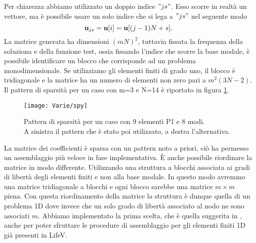 Per chiarezza abbiamo utilizzato un doppio indice $"js"$. Esso scorre in realt\`a  un vettore,
ma \`e possibile usare un solo indice che si lega a $"js"$ nel seguente modo
$$\mathbf{u}_{js}=\mathbf{u}[i]=\mathbf{u}[(j-1)N+s].$$ 
 La matrice generata ha dimensioni $(mN)^2$, tuttavia fissata
 la frequenza della soluziona e della funzione test, ossia fissando l'indice che scorre la base modale,
 \`e possibile identificare un blocco che corrisponde ad un problema monodimensionale.
Se utilizziamo gli elementi finiti di grado uno, il blocco \`e tridiagonale e
 la matrice ha un numero di elementi non zero pari a $m^2(3N-2)$. 
 Il pattern di sparsit\`a per un caso con m=3 e N=14 \`e riportato in figura \ref{fig:pattern}.
 \begin{figure}[!h]
    \centering
    \texttt{[image: Varie/spy]}
    \caption{Pattern di sparsit\`a per un caso con 9 elementi P1 e 8 modi.\\A sinistra il pattern che \`e stato poi utilizzato, a destra l'alternativa.}
    \label{fig:pattern}
\end{figure}
La matrice dei coefficienti \`e sparsa con un pattern noto a priori, ci\`o ha permesso 
 un assemblaggio pi\`u veloce in fase implementativa.
 \`E anche possibile riordinare la matrice in modo differente. Utilizzando una struttura 
 a blocchi associata ai gradi di libert\`a degli elementi finiti e non alla base modale.
 In questo modo avremmo una matrice tridiagonale a blocchi e ogni blocco sarebbe una matrice
 $m\times m$ piena. Con questa riordinamento della matrice la struttura \`e dunque quella 
 di un problema 1D dove invece che un solo grado di libert\`a associato al nodo ne sono associati $m$.
 Abbiamo implementato la prima scelta, che \`e quella suggerita in
 \cite{perotto:2008}, anche per poter sfruttare le procedure di assemblaggio 
 per gli elementi finiti 1D gi\`a presenti in LifeV.
\clearpage

